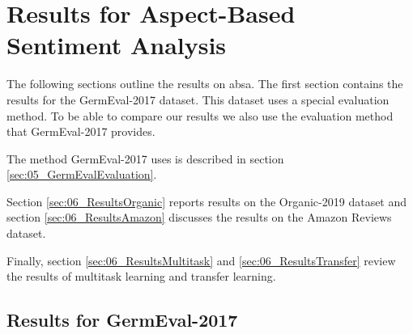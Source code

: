 \section{Results for Aspect-Based Sentiment Analysis}
The following sections outline the results on \acrfull{absa}. The first section contains the results for the GermEval-2017 dataset. This dataset uses a special evaluation method. To be able to compare our results we also use the evaluation method that GermEval-2017 provides.

The method GermEval-2017 uses is described in section \ref{sec:05_GermEvalEvaluation}.
\medskip

Section \ref{sec:06_ResultsOrganic} reports results on the Organic-2019 dataset and section \ref{sec:06_ResultsAmazon} discusses the results on the Amazon Reviews dataset.

Finally, section \ref{sec:06_ResultsMultitask} and \ref{sec:06_ResultsTransfer} review the results of multitask learning and transfer learning.

\subsection{Results for GermEval-2017}
\label{sec:06_ResultsGermEval}


